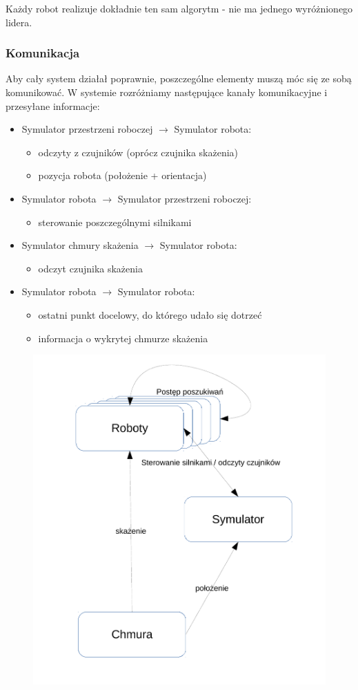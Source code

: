 \documentclass[a4paper, 12pt]{article}
\begin{document}
	Każdy robot realizuje dokładnie ten sam algorytm - nie ma jednego wyróżnionego lidera.
	
	\subsubsection{Komunikacja}
	Aby cały system działał poprawnie, poszczególne elementy muszą móc się ze sobą komunikować. W systemie rozróżniamy następujące kanały komunikacyjne i przesyłane informacje:
	\begin{itemize}
	\item Symulator przestrzeni roboczej $\rightarrow$ Symulator robota:
		\begin{itemize}
		\item odczyty z czujników (oprócz czujnika skażenia)
		\item pozycja robota (położenie + orientacja)	
		\end{itemize}
	\item Symulator robota $\rightarrow$ Symulator przestrzeni roboczej:
		\begin{itemize}
		\item sterowanie poszczególnymi silnikami
		\end{itemize}
	\item Symulator chmury skażenia $\rightarrow$ Symulator robota:
		\begin{itemize}
		\item odczyt czujnika skażenia
		\end{itemize}
	\item Symulator robota $\rightarrow$ Symulator robota:
		\begin{itemize}
		\item ostatni punkt docelowy, do którego udało się dotrzeć
		\item informacja o wykrytej chmurze skażenia
		\end{itemize}
	
	\end{itemize}
	
	\begin{figure}[h!]
	\centering
	\includegraphics[width=0.6\columnwidth]{img/system.pdf}
	\end{figure}
	
\end{document}
